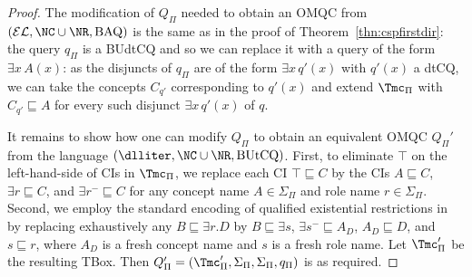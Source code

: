 \documentclass{lmcs}
\theoremstyle{definition}
\begin{document}
\begin{proof}
The modification of $Q_{\Pi}$ needed to obtain an OMQC from
$(\mathcal{EL},\NC\cup \NR,\text{BAQ})$ is the same as in the proof of Theorem~\ref{thn:cspfirstdir}:
the query $q_{\Pi}$ is a BUdtCQ and so we can replace it with a query of the form $\exists x\,A(x)$:
as the disjuncts of $q_{\Pi}$ are of the form $\exists x\, q'(x)$ with $q'(x)$ a dtCQ, we can take the 
\EL concepts $C_{q'}$ corresponding to $q'(x)$ and extend $\Tmc_{\Pi}$ with $C_{q'}
\sqsubseteq A$ for every such disjunct $\exists x\, q'(x)$ of $q$.
%
%
%
%
%

It remains to show how one can modify $Q_{\Pi}$ to obtain an equivalent OMQC $Q_{\Pi}'$ from the language
$(\dlliter,\NC\cup\NR,\text{BUtCQ})$. First, 
to eliminate $\top$ on the left-hand-side of CIs in $\Tmc_{\Pi}$, we replace 
each CI $\top\sqsubseteq C$ by the CIs $A\sqsubseteq C$, $\exists
r\sqsubseteq C$, and $\exists r^{-}\sqsubseteq C$ for any concept name
$A\in \Sigma_{\Pi}$ and role name $r\in \Sigma_{\Pi}$. Second, we
employ the standard encoding of qualified existential restrictions in
\dlliter by replacing exhaustively any $B \sqsubseteq
\exists r.D$ by $B \sqsubseteq \exists s$, $\exists s^{-} \sqsubseteq
A_{D}$, $A_{D} \sqsubseteq D$, and $s \sqsubseteq r$, where $A_{D}$ is
a fresh concept name and $s$ is a fresh role name. Let
$\Tmc_{\Pi}'$ be the resulting TBox.  Then $Q_{\Pi}'=(\Tmc_{\Pi}',\Sigma_{\Pi},\Sigma_{\Pi},q_{\Pi})$ is as required.
\end{proof}
\end{document}
